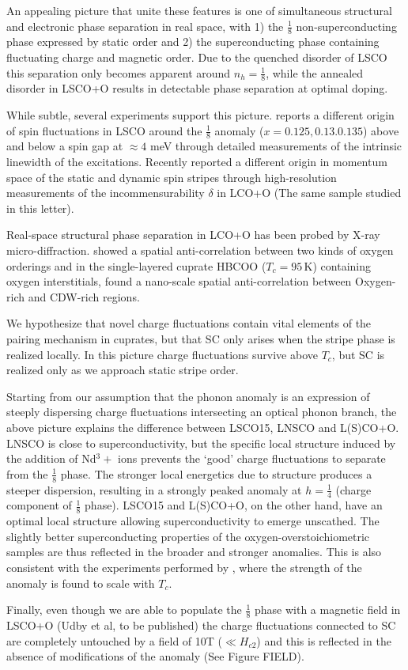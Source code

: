 An appealing picture that unite these features is one of simultaneous structural and electronic phase separation in real space, with 1) the $\frac{1}{8}$ non-superconducting phase  expressed by static order and 2) the superconducting phase containing fluctuating charge and magnetic order. Due to the quenched disorder of LSCO this separation only becomes apparent around $n_h = \frac{1}{8}$, while the annealed disorder in LSCO+O results in detectable phase separation at optimal doping.

While subtle, several experiments support this picture. \citeauthor{Kofu2009} reports a different origin of spin fluctuations in LSCO around the $\frac{1}{8}$ anomaly ($x=0.125,0.13.0.135$) above and below a spin gap at $\approx 4$ meV through detailed measurements of the intrinsic linewidth of the excitations. Recently \citeauthor{Jacobsen2018}\cite{Jacobsen2018} reported a different origin in momentum space of the static and dynamic spin stripes through high-resolution measurements of the incommensurability $\delta$ in LCO+O (The same sample studied in this letter). 

Real-space structural phase separation in LCO+O has been probed by X-ray micro-diffraction. \citeauthor{Poccia2012} showed a spatial anti-correlation between two kinds of oxygen orderings\cite{Poccia2012} and in the single-layered cuprate HBCOO ($T_c = 95\,\text{K}$) containing oxygen interstitials, \citeauthor{Campi2015} found a nano-scale spatial anti-correlation between Oxygen-rich and CDW-rich regions\cite{Campi2015}.

We hypothesize that novel charge fluctuations contain vital elements of the pairing mechanism in cuprates, but that SC only arises when the stripe phase is realized locally. In this picture charge fluctuations survive above $T_c$, but SC is realized only as we approach static stripe order.

Starting from our assumption that the phonon anomaly is an expression of steeply dispersing charge fluctuations intersecting an optical phonon branch\cite{Kaneshita2002}, the above picture explains the difference between LSCO15, LNSCO and L(S)CO+O. LNSCO is close to superconductivity, but the specific local structure induced by the addition of Nd$^3+$ ions prevents the `good' charge fluctuations to separate from the $\frac{1}{8}$ phase. The stronger local energetics due to structure produces a steeper dispersion, resulting in a strongly peaked anomaly at $h=\frac{1}{4}$ (charge component of $\frac{1}{8}$ phase). LSCO15 and L(S)CO+O, on the other hand, have an optimal local structure allowing superconductivity to emerge unscathed. The slightly better superconducting properties of the oxygen-overstoichiometric samples are thus reflected in the broader and stronger anomalies. This is also consistent with the experiments performed by \citeauthor{Park2014}\cite{Park2014}, where the strength of the anomaly is found to scale with $T_c$.

Finally, even though we are able to populate the $\frac{1}{8}$ phase with a magnetic field in LSCO+O (Udby et al, to be published) the charge fluctuations connected to SC are completely untouched by a field of 10T ($\ll H_{c2}$) and this is reflected in the absence of modifications of the anomaly (See Figure FIELD).
